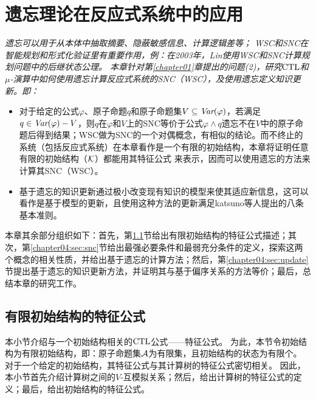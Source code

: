 
\chapter{遗忘理论在反应式系统中的应用}
\label{chapter04}

{\em
遗忘可以用于从本体中抽取摘要、隐蔽敏感信息、计算逻辑差等；
WSC和SNC在智能规划和形式化验证里有重要作用，例：在2003年，Lin使用WSC和SNC计算规划问题中的后继状态公理。
本章针对第\ref{chapter01}章提出的问题(2)，研究$\textrm{CTL}$和$\mu$-演算中如何使用遗忘计算反应式系统的SNC（WSC），及使用遗忘定义知识更新。即：
\begin{itemize}
	\item 对于给定的公式$\varphi$、原子命题$q$和原子命题集$V\subseteq \textit{Var}(\varphi)$，若满足$q \in \textit{Var}(\varphi)-V$，则$q$在$\varphi$和$V$上的SNC等价于公式$\varphi \wedge q$遗忘不在$V$中的原子命题后得到结果；WSC做为SNC的一个对偶概念，有相似的结论。而不终止的系统（包括反应式系统）在本章看作是一个有限的初始结构，本章将证明任意有限的初始结构（${\cal K}$）都能用其特征公式%
	来表示，因而可以使用遗忘的方法来计算其SNC（WSC）。
	\item 基于遗忘的知识更新通过极小改变现有知识的模型来使其适应新信息，这可以看作是基于模型的更新，且使用这种方法的更新满足katsuno等人提出的八条基本准则\cite{katsuno91mendelzon}。
\end{itemize}

本章其余部分组织如下：首先，第\ref{chapter06:sec:des}节给出有限初始结构的特征公式描述；其次，第\ref{chapter04:sec:snc}节给出最强必要条件和最弱充分条件的定义，探索这两个概念的相关性质，并给出基于遗忘的计算方法；然后，第\ref{chapter04:sec:update}节提出基于遗忘的知识更新方法，并证明其与基于偏序关系的方法等价；最后，总结本章的研究工作。}

\section{有限初始结构的特征公式}\label{chapter06:sec:des}%
本小节介绍与一个初始结构相关的$\textrm{CTL}$公式——特征公式。
为此，本节令初始结构为有限初始结构，即：原子命题集${\cal A}$为有限集，且初始结构的状态为有限个。
对于一个给定的初始结构，其特征公式与其计算树的特征公式密切相关。
因此，本小节首先介绍计算树之间的$V$-互模拟关系；然后，给出计算树的特征公式的定义；最后，给出初始结构的特征公式。

